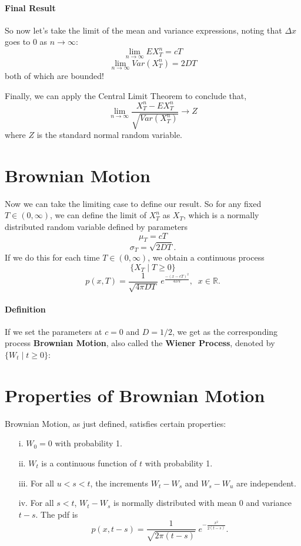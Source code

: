 \documentclass[a4paper,12pt]{scrartcl}
\begin{document}
\paragraph{Final Result} So now let's take the limit of the mean and 
variance expressions, noting that $\Delta x$ goes to $0$ as 
$n\rightarrow \infty$:
   \[ \lim_{n\rightarrow \infty} EX^n_T = cT  \]
   \[ \lim_{n\rightarrow \infty} Var(X^n_T)= 2DT  \]
both of which are bounded! 

Finally, we can apply the Central Limit Theorem to conclude that, 
   \[\lim_{n \rightarrow \infty} \frac{X^n_T - 
      EX^n_T}{\sqrt{Var(X^n_T)}} \rightarrow Z \]
where $Z$ is the standard normal random variable. 

\section{Brownian Motion} 

Now we can take the limiting case to define our result. So for any fixed 
$ T \in (0,\infty)$, we can define the limit of $X^n_T$ as $X_T$, which
is a normally distributed random variable defined by parameters
   \[ \mu_T = cT \]
   \[ \sigma_T = \sqrt{2DT}.\]
If we do this for each time $T \in (0,\infty)$, we obtain a 
continuous process 
   \[ \{ X_T \; |\; T \geq 0 \}  \]
   \[p(x,T) = \frac{1}{\sqrt{4\pi DT}} \;
      e^{\frac{-(x - cT)^2}{4DT}}, \;\; x \in \mathbb{R}.\]

\paragraph{Definition} If we set the parameters at $c = 0$ and $D = 1/2$,
we get as the corresponding process \textbf{Brownian Motion}, also 
called the \textbf{Wiener Process}, denoted by $\{ W_t\;|\; t\geq 0\}$:

\section{Properties of Brownian Motion}

Brownian Motion, as just defined, satisfies certain properties:
\begin{enumerate}
   \item[i.]{$W_0 = 0$ with probability 1.}
   \item[ii.]{$W_t$ is a continuous function of $t$ with probability 1.}
   \item[iii.]{For all $u < s < t$, the increments $W_t - W_s$ and
      $W_s - W_u$ are independent.}
   \item[iv.]{For all $s <t$, $W_t - W_s$ is normally distributed with
      mean $0$ and variance $t-s$.  The pdf is
      \[ p(x,t-s) =  \frac{1}{\sqrt{2\pi (t-s)}} \; 
	 e^{-\frac{x^2}{2(t-s)}}.\]
      }
\end{enumerate}
\end{document}
